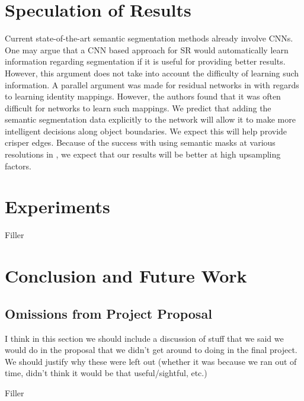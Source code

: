 \documentclass[10pt,twocolumn,letterpaper]{article}
\begin{document}
\section{Speculation of Results}
Current state-of-the-art semantic segmentation methods already involve CNNs.
One may argue that a CNN based approach for SR would automatically learn
information regarding segmentation if it is useful for providing better
results. However, this argument does not take into account the difficulty of
learning such information. A parallel argument was made for residual networks
in \cite{ResNet} with regards to learning identity mappings. However, the
authors found that it was often difficult for networks to learn such mappings.
We predict that adding the semantic segmentation data explicitly to the network
will allow it to make more intelligent decisions along object boundaries. We
expect this will help provide crisper edges. Because of the success with using
semantic masks at various resolutions in \cite{ImageSynthesis}, we expect that
our results will be better at high upsampling factors.

\section{Experiments}
Filler

\section{Conclusion and Future Work}
\label{sec:conclusion}

\subsection{Omissions from Project Proposal}
I think in this section we should include a discussion of stuff that we said we
would do in the proposal that we didn't get around to doing in the final
project. We should justify why these were left out (whether it was because we
ran out of time, didn't think it would be that useful/sightful, etc.)

Filler

{\small


}
\end{document}
